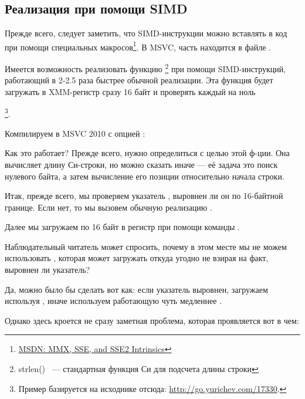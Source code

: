 ﻿\subsection{Реализация \strlen при помощи SIMD}
\label{SIMD_strlen}

\newcommand{\URLMSDNSSE}{\href{http://go.yurichev.com/17262}{MSDN: MMX, SSE, and SSE2 Intrinsics}}

Прежде всего, следует заметить, что SIMD-инструкции можно вставлять в \CCpp код при помощи специальных 
макросов\footnote{\URLMSDNSSE}. В MSVC, часть находится в файле .

\newcommand{\URLSTRLEN}{http://go.yurichev.com/17330}

Имеется возможность реализовать функцию \strlen\footnote{strlen() ~--- стандартная функция Си 
для подсчета длины строки} при помощи SIMD-инструкций, работающий в 2-2.5 раза быстрее обычной реализации. 
Эта функция будет загружать в XMM-регистр сразу 16 байт и проверять каждый на ноль

\footnote{Пример базируется на исходнике отсюда: \url{\URLSTRLEN}.}.



Компилируем в MSVC 2010 с опцией \Ox:



Как это работает?
Прежде всего, нужно определиться с целью этой ф-ции.
Она вычисляет длину Си-строки, но можно сказать иначе --- её задача это поиск нулевого байта, а затем вычисление его позиции относительно начала строки.

Итак, прежде всего, мы проверяем указатель , выровнен ли он по 16-байтной границе. 
Если нет, то мы вызовем обычную реализацию \strlen.

Далее мы загружаем по 16 байт в регистр  при помощи команды \MOVDQA.

Наблюдательный читатель может спросить, почему в этом месте мы не можем использовать \MOVDQU, 
которая может загружать откуда угодно не взирая на факт, выровнен ли указатель?

Да, можно было бы сделать вот как: если указатель выровнен, загружаем используя \MOVDQA, 
иначе используем работающую чуть медленнее \MOVDQU.

Однако здесь кроется не сразу заметная проблема, которая проявляется вот в чем:

\newcommand{\URLPAGE}{\href{http://go.yurichev.com/17136}{wikipedia}}

